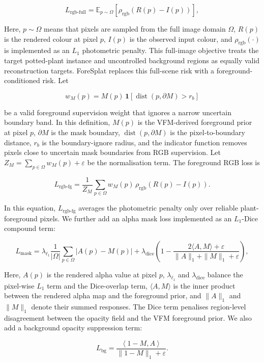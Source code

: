 \documentclass[a4paper]{cas-sc}
\begin{document}
\[
L_{\text{rgb-full}}=
\mathbb{E}_{p\sim\Omega}\left[\rho_{\text{rgb}}\left(R(p)-I(p)\right)\right],
\]

Here, \(p\sim\Omega\) means that pixels are sampled from the full image domain \(\Omega\), \(R(p)\) is the rendered colour at pixel \(p\), \(I(p)\) is the observed input colour, and \(\rho_{\text{rgb}}(\cdot)\) is implemented as an \(L_1\) photometric penalty. This full-image objective treats the target potted-plant instance and uncontrolled background regions as equally valid reconstruction targets. ForeSplat replaces this full-scene risk with a foreground-conditioned risk. Let

\[
w_M(p)=M(p)\,\mathbf{1}\left[\operatorname{dist}\left(p,\partial M\right)>r_b\right]
\]

be a valid foreground supervision weight that ignores a narrow uncertain boundary band. In this definition, \(M(p)\) is the VFM-derived foreground prior at pixel \(p\), \(\partial M\) is the mask boundary, \(\operatorname{dist}(p,\partial M)\) is the pixel-to-boundary distance, \(r_b\) is the boundary-ignore radius, and the indicator function removes pixels close to uncertain mask boundaries from RGB supervision. Let \(Z_M=\sum_{p\in\Omega}w_M(p)+\varepsilon\) be the normalisation term. The foreground RGB loss is

\[
L_{\text{rgb-fg}}=
\frac{1}{Z_M}\sum_{p\in\Omega}w_M(p)\,
\rho_{\text{rgb}}\left(R(p)-I(p)\right).
\]

In this equation, \(L_{\text{rgb-fg}}\) averages the photometric penalty only over reliable plant-foreground pixels. We further add an alpha mask loss implemented as an \(L_1\)-Dice compound term:

\[
L_{\text{mask}}=
\lambda_{\ell_1}\frac{1}{|\Omega|}\sum_{p\in\Omega}|A(p)-M(p)|
+\lambda_{\text{dice}}\left(1-
\frac{2\langle A,M\rangle+\varepsilon}
{\|A\|_1+\|M\|_1+\varepsilon}
\right),
\]

Here, \(A(p)\) is the rendered alpha value at pixel \(p\), \(\lambda_{\ell_1}\) and \(\lambda_{\text{dice}}\) balance the pixel-wise \(L_1\) term and the Dice-overlap term, \(\langle A,M\rangle\) is the inner product between the rendered alpha map and the foreground prior, and \(\|A\|_1\) and \(\|M\|_1\) denote their summed responses. The Dice term penalises region-level disagreement between the opacity field and the VFM foreground prior. We also add a background opacity suppression term:

\[
L_{\text{bg}}=
\frac{\left\langle 1-M,A\right\rangle}
{\|1-M\|_1+\varepsilon} .
\]
\end{document}

